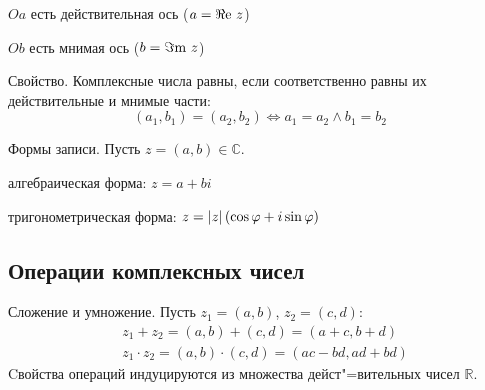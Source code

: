 \begin{list*}
\item $Oa$ есть действительная ось {\ital\color{desc}($a=\Re\text{e}\ z$)}
\item $Ob$ есть мнимая ось {\ital\color{desc}($b=\Im\text{m}\ z$)}
\end{list*}
\begin{theorem}
{\bold Свойство.} Комплексные числа {\ital равны}, если соответственно равны их действительные и мнимые части:
$$(a_1,b_1)=(a_2,b_2)\iff a_1=a_2\land b_1=b_2$$
\end{theorem}
\begin{theorem}
{\bold Формы записи.} Пусть $z=(a,b)\in\mathbb{C}$.
\begin{list*}
\item алгебраическая форма: $z=a+bi$
\item тригонометрическая форма: $z=\abs{z}(\cos\varphi+i\sin\varphi)$
\end{list*}
\end{theorem}

\subsection{Операции комплексных чисел}

\begin{theorem}
{\bold Сложение и умножение.} Пусть $z_1=(a,b)$, $z_2=(c,d)$:
$$\begin{aligned}
&z_1+z_2=(a,b)+(c,d)=(a+c,b+d)\\
&z_1\cdot z_2=(a,b)\cdot(c,d)=(ac-bd,ad+bd)
\end{aligned}$$
Cвойства операций {\ital индуцируются} из множества дейст"=вительных чисел $\mathbb{R}$. 
\end{theorem}

